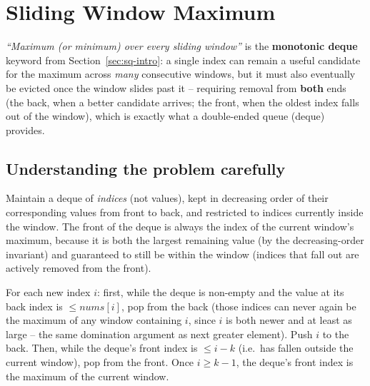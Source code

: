 \section{Sliding Window Maximum}
\label{sec:sq-sliding-window-max}


\begin{patternbox}
\emph{``Maximum (or minimum) over every sliding window''} is the
\textbf{monotonic deque} keyword from Section~\ref{sec:sq-intro}: a
single index can remain a useful candidate for the maximum across
\emph{many} consecutive windows, but it must also eventually be evicted
once the window slides past it -- requiring removal from \textbf{both}
ends (the back, when a better candidate arrives; the front, when the
oldest index falls out of the window), which is exactly what a
double-ended queue (deque) provides.
\end{patternbox}

\subsection*{Understanding the problem carefully}

Maintain a deque of \emph{indices} (not values), kept in decreasing order
of their corresponding values from front to back, and restricted to
indices currently inside the window. The front of the deque is always the
index of the current window's maximum, because it is both the largest
remaining value (by the decreasing-order invariant) and guaranteed to
still be within the window (indices that fall out are actively removed
from the front).

\begin{ideabox}
For each new index $i$: first, while the deque is non-empty and the value
at its back index is $\le \textit{nums}[i]$, pop from the back (those
indices can never again be the maximum of any window containing $i$,
since $i$ is both newer and at least as large -- the same domination
argument as next greater element). Push $i$ to the back. Then, while the
deque's front index is $\le i-k$ (i.e.\ has fallen outside the current
window), pop from the front. Once $i \ge k-1$, the deque's front index is
the maximum of the current window.
\end{ideabox}

